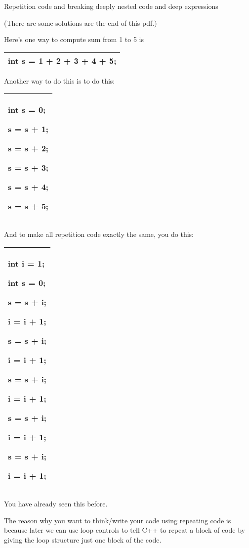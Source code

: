 \documentclass[
]{article}
\begin{document}
Repetition code and breaking deeply nested code and deep expressions

(There are some solutions are the end of this pdf.)

Here's one way to compute sum from 1 to 5 is

\begin{longtable}[]{@{}l@{}}
\toprule
\endhead
int s = 1 + 2 + 3 + 4 + 5;\tabularnewline
\bottomrule
\end{longtable}

Another way to do this is to do this:

\begin{longtable}[]{@{}l@{}}
\toprule
\endhead
\begin{minipage}[t]{0.97\columnwidth}\raggedright
int s = 0;

s = s + 1;

s = s + 2;

s = s + 3;

s = s + 4;

s = s + 5;\strut
\end{minipage}\tabularnewline
\bottomrule
\end{longtable}

And to make all repetition code exactly the same, you do this:

\begin{longtable}[]{@{}l@{}}
\toprule
\endhead
\begin{minipage}[t]{0.97\columnwidth}\raggedright
int i = 1;

int s = 0;

s = s + i;

i = i + 1;

s = s + i;

i = i + 1;

s = s + i;

i = i + 1;

s = s + i;

i = i + 1;

s = s + i;

i = i + 1;\strut
\end{minipage}\tabularnewline
\bottomrule
\end{longtable}

You have already seen this before.

The reason why you want to think/write your code using repeating code is
because later we can use loop controls to tell C++ to repeat a block of
code by giving the loop structure just one block of the code.
\end{document}
